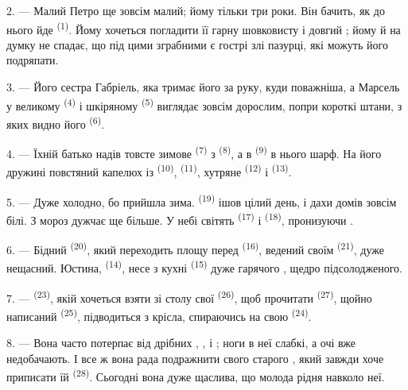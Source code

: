 2. --- Малий Петро ще зовсім малий; йому тільки три роки. Він бачить, як до
нього йде  \textsuperscript{(1)}. Йому хочеться погладити її гарну
шовковисту  і довгий ; йому й на думку не спадає,
що під цими зграбними  є гострі злі пазурці, які можуть його
подряпати.

3. --- Його сестра Габріель, яка тримає його за руку, куди поважніша, а Марсель
у великому  \textsuperscript{(4)} і шкіряному 
\textsuperscript{(5)} виглядає зовсім дорослим, попри короткі штани, з яких
видно його  \textsuperscript{(6)}.

4. --- Їхній батько надів товсте зимове  \textsuperscript{(7)} з
 \textsuperscript{(8)}, а в 
\textsuperscript{(9)} в нього шарф. На його дружині повстяний капелюх із
 \textsuperscript{(10)},  \textsuperscript{(11)},
хутряне  \textsuperscript{(12)} і 
\textsuperscript{(13)}.

5. --- Дуже холодно, бо прийшла зима.  \textsuperscript{(19)} ішов
цілий день, і дахи домів зовсім білі. З  мороз дужчає ще більше. У
небі світять  \textsuperscript{(17)} і 
\textsuperscript{(18)}, пронизуючи .

\VUsaut{4.2mm}
\VUsaut{3.0mm}

6. --- Бідний  \textsuperscript{(20)}, який переходить площу
перед  \textsuperscript{(16)}, ведений своїм 
\textsuperscript{(21)}, дуже нещасний. Юстина, 
\textsuperscript{(14)}, несе з кухні  \textsuperscript{(15)} дуже
гарячого , щедро підсолодженого.

7. ---  \textsuperscript{(23)}, якій хочеться взяти зі столу свої
 \textsuperscript{(26)}, щоб прочитати 
\textsuperscript{(27)}, щойно написаний  \textsuperscript{(25)},
підводиться з крісла, спираючись на свою 
\textsuperscript{(24)}.

8. --- Вона часто потерпає від дрібних , ,
 і ; ноги в неї слабкі, а очі вже
недобачають. І все ж вона рада подражнити свого старого , який
завжди хоче приписати їй  \textsuperscript{(28)}. Сьогодні вона
дуже щаслива, що молода рідня навколо неї.

